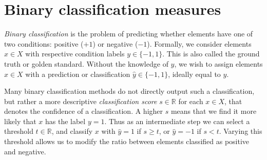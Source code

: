 \documentclass[thesis.tex]{subfiles}
\begin{document}
%
\section{Binary classification measures}
\label{sec:binaryClassificationMeasures}
%
\emph{Binary classification} is the problem of predicting whether elements have one of two conditions: positive ($+1$) or negative ($-1$). Formally, we consider elements $x \in X$ with respective condition labels $y \in \{-1, 1\}$. This is also called the ground truth or golden standard. Without the knowledge of $y$, we wish to assign elements $x \in X$ with a prediction or classification $\hat{y} \in \{-1, 1\}$, ideally equal to $y$.

Many binary classification methods do not directly output such a classification, but rather a more descriptive \emph{classification score} $s \in \mathbb{R}$ for each $x \in X$, that denotes the confidence of a classification. A higher $s$ means that we find it more likely that $x$ has the label $y = 1$. Thus as an intermediate step we can select a threshold $t \in \mathbb{R}$, and classify $x$ with $\hat{y} = 1$ if $s \geq t$, or $\hat{y} = -1$ if $s < t$. Varying this threshold allows us to modify the ratio between elements classified as positive and negative.
\end{document}
